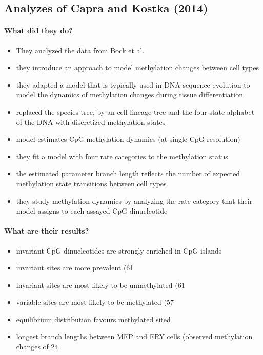 \documentclass[12pt]{article} %
\begin{document}
	\subsection{Analyzes of Capra and Kostka (2014)}
	\paragraph{What did they do?}
	\begin{itemize}
		\item They analyzed the data from Bock et al.
		\item they introduce an approach to model methylation changes between cell types
		\item they adapted a model that is typically used in DNA sequence evolution to model the dynamics of methylation changes during tissue differentiation
		\item replaced the species tree, by an cell lineage tree and the four-state alphabet of the DNA with discretized methylation states
		\item model estimates CpG methylation dynamics (at single CpG resolution)
		\item they fit a model with four rate categories to the methylation status
		\item the estimated parameter branch length reflects the number of expected methylation state transitions between cell types
		\item they study methylation dynamics by analyzing the rate category that their model assigns to each assayed CpG dinucleotide
	\end{itemize}
	
	\paragraph{What are their results?}
	\begin{itemize}
		\item invariant CpG dinucleotides are strongly enriched in CpG islands
		\item invariant sites are more prevalent (61%
		\item invariant sites are most likely to be unmethylated (61%
		\item variable sites are most likely to be methylated (57%
		\item equilibrium distribution favours methylated sited
		\item longest branch lengths between MEP and ERY cells (observed methylation changes of 24%
	\end{itemize}
	
\end{document}
